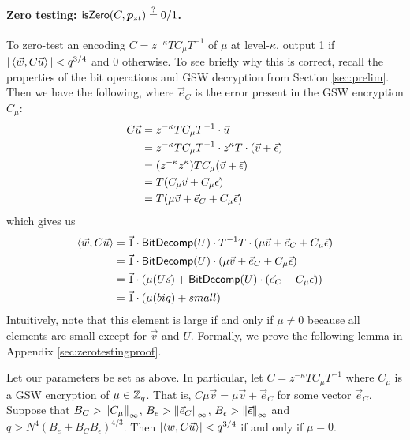 \paragraph{Zero testing:  $\mathsf{isZero}(C, \bm{p}_{zt}) \stackrel{?}{=} 0/1$.}  To zero-test an encoding $C = z^{-\kappa} T C_\mu T^{-1}$ of $\mu$ at level-$\kappa$, output 1 if $|\left<\vec{w}, C\vec{u}\right>| < q^{3/4}$ and 0 otherwise.  To see briefly why this is correct, recall the properties of the bit operations and GSW decryption from Section \ref{sec:prelim}.  Then we have the following, where $\vec{e}_C$ is the error present in the GSW encryption $C_\mu$:
\begin{align*}
C\vec{u} &= z^{-\kappa} T C_\mu T^{-1} \cdot \vec{u}\\
&= z^{-\kappa} T C_\mu  T^{-1} \cdot z^\kappa T\cdot (\vec{v} + \vec{\epsilon})\\
&= (z^{-\kappa} z^{\kappa}) T C_\mu (\vec{v} + \vec{\epsilon})\\
&= T (C_\mu\vec{v} + C_\mu\vec{\epsilon})\\
&= T (\mu \vec{v} + \vec{e}_C + C_\mu\vec{\epsilon})
\end{align*}
which gives us
\begin{align*}
\left<\vec{w}, C\vec{u}\right> &= \vec{1}\cdot\mathsf{BitDecomp}(U)\cdot T^{-1} T \cdot (\mu \vec{v} + \vec{e}_C + C_\mu\vec{\epsilon})\\
&= \vec{1}\cdot\mathsf{BitDecomp}(U) \cdot (\mu \vec{v} + \vec{e}_C + C_\mu\vec{\epsilon})\\
&= \vec{1}\cdot(\mu(U \vec{s}) + \mathsf{BitDecomp}(U)\cdot (\vec{e}_C + C_\mu\vec{\epsilon}))\\
&= \vec{1}\cdot(\mu(big) + small)
\end{align*} 
Intuitively, note that this element is large if and only if $\mu \not= 0$ because all elements are small except for $\vec{v}$ and $U$.  Formally, we prove the following lemma in Appendix \ref{sec:zerotestingproof}.

\begin{lemma}
\label{zerotesting}
Let our parameters be set as above.  In particular, let $C = z^{-\kappa} TC_\mu T^{-1}$ where $C_\mu$ is a GSW encryption of $\mu \in \mathbb{Z}_q$.  That is, $C\mu\vec{v} = \mu\vec{v} + \vec{e}_C$ for some vector $\vec{e}_C$.  Suppose that $B_C > \left\lVert C_\mu\right\rVert_\infty$, $B_{e} > \left\lVert\vec{e}_C\right\rVert_\infty$, $B_\epsilon > \left\lVert\vec{\epsilon}\right\rVert_\infty$ and $q > N^4(B_e + B_CB_\epsilon)^{4/3}$. Then $|\langle w, C\vec{u}\rangle| < q^{3/4}$ if and only if $\mu = 0$.
\end{lemma}

